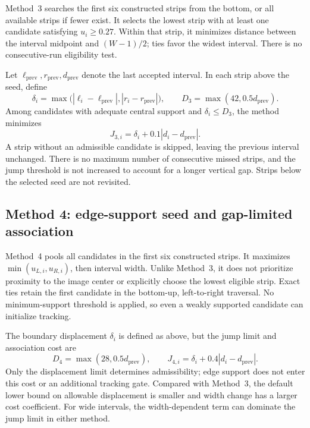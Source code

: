 Method~3 searches the first six constructed strips from the bottom, or
all available strips if fewer exist. It selects the lowest strip with at
least one candidate satisfying $u_i\geq0.27$. Within that strip, it
minimizes distance between the interval midpoint and $(W-1)/2$; ties
favor the widest interval. There is no consecutive-run eligibility test.

Let $\ell_{\mathrm{prev}},r_{\mathrm{prev}},d_{\mathrm{prev}}$ denote
the last accepted interval. In each strip above the seed, define
\begin{equation}
    \delta_i=\max\bigl(|\ell_i-\ell_{\mathrm{prev}}|,
                            |r_i-r_{\mathrm{prev}}|\bigr),\qquad
    D_3=\max(42,0.5d_{\mathrm{prev}}).
\end{equation}
Among candidates with adequate central support and $\delta_i\leq D_3$,
the method minimizes
\begin{equation}
    J_{3,i}=\delta_i+0.1|d_i-d_{\mathrm{prev}}|.
    \label{eq:c4_cost3}
\end{equation}
A strip without an admissible candidate is skipped, leaving the previous
interval unchanged. There is no maximum number of consecutive missed
strips, and the jump threshold is not increased to account for a longer
vertical gap. Strips below the selected seed are not revisited.

\subsection{Method 4: edge-support seed and gap-limited association}
\label{subsec:c4_seed4}

Method~4 pools all candidates in the first six constructed strips. It
maximizes $\min(u_{L,i},u_{R,i})$, then interval width. Unlike Method~3,
it does not prioritize proximity to the image center or explicitly choose
the lowest eligible strip. Exact ties retain the first candidate in the
bottom-up, left-to-right traversal. No minimum-support threshold is
applied, so even a weakly supported candidate can initialize tracking.

The boundary displacement $\delta_i$ is defined as above, but the jump
limit and association cost are
\begin{equation}
    D_4=\max(28,0.5d_{\mathrm{prev}}),\qquad
    J_{4,i}=\delta_i+0.4|d_i-d_{\mathrm{prev}}|.
    \label{eq:c4_cost4}
\end{equation}
Only the displacement limit determines admissibility; edge support does
not enter this cost or an additional tracking gate. Compared with
Method~3, the default lower bound on allowable displacement is smaller
and width change has a larger cost coefficient. For wide intervals,
the width-dependent term can dominate the jump limit in either method.

